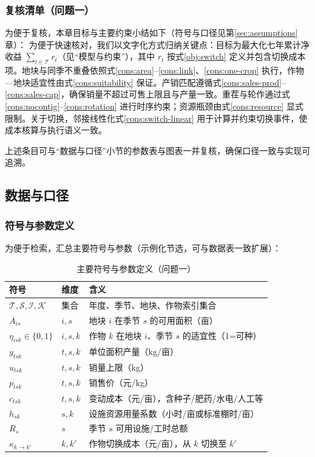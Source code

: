 \subsubsection{复核清单（问题一）}
为便于复核，本章目标与主要约束小结如下\linebreak[2]（符号与口径见第\ref{sec:assumptions}章）：
为便于快速核对，我们以文字化方式归纳关键点：目标为最大化七年累计净收益 $\sum_{t\in\mathcal{T}} r_t$（见“模型与约束”），其中 $r_t$ 按式\eqref{obj:switch} 定义并包含切换成本项。地块与同季不重叠依照式\eqref{cons:area}--\eqref{cons:link}、\eqref{cons:one-crop} 执行，作物—地块适宜性由式\eqref{cons:suitability} 保证。产销匹配遵循式\eqref{cons:sales-prod}--\eqref{cons:sales-cap}，确保销量不超过可售上限且与产量一致。重茬与轮作通过式\eqref{cons:nocontig}--\eqref{cons:rotation} 进行时序约束；资源瓶颈由式\eqref{cons:resource} 显式限制。关于切换，邻接线性化式\eqref{cons:switch-linear} 用于计算并约束切换事件，使成本核算与执行语义一致。

上述条目可与“数据与口径”小节的参数表与图表一并复核，确保口径一致与实现可追溯。

\subsection{数据与口径}
\subsubsection{符号与参数定义}
为便于检索，汇总主要符号与参数（示例化节选，可与数据表一致扩展）：
\begin{table}[H]
\centering
\caption{主要符号与参数定义（问题一）}\label{tab:symbols}
\begin{tabular}{@{}ll >{\raggedright\arraybackslash}p{8.5cm}@{}}
\toprule
符号 & 维度 & 含义 \\
\midrule
$\mathcal{T},\mathcal{S},\mathcal{I},\mathcal{K}$ & 集合 & 年度、季节、地块、作物索引集合 \\
$A_{is}$ & $i,s$ & 地块 $i$ 在季节 $s$ 的可用面积（亩） \\
$\eta_{isk}\in\{0,1\}$ & $i,s,k$ & 作物 $k$ 在地块 $i$、季节 $s$ 的适宜性（1=可种） \\
$y_{tsk}$ & $t,s,k$ & 单位面积产量（kg/亩） \\
$u_{tsk}$ & $t,s,k$ & 销量上限（kg） \\
$p_{tsk}$ & $t,s,k$ & 销售价（元/kg） \\
$c_{tsk}$ & $t,s,k$ & 变动成本（元/亩），含种子/肥药/水电/人工等 \\
$h_{sk}$ & $s,k$ & 设施资源用量系数（小时/亩或标准棚时/亩） \\
$R_s$ & $s$ & 季节 $s$ 可用设施/工时总额 \\
$\kappa_{k\to k'}$ & $k,k'$ & 作物切换成本（元/亩），从 $k$ 切换至 $k'$ \\
\bottomrule
\end{tabular}
\end{table}

